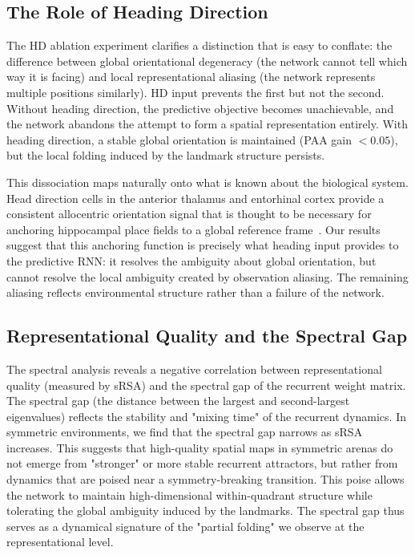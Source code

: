 \documentclass[11pt, a4paper]{article}
\begin{document}
\subsection{The Role of Heading Direction}

The HD ablation experiment clarifies a distinction that is easy to
conflate: the difference between global orientational degeneracy (the
network cannot tell which way it is facing) and local representational
aliasing (the network represents multiple positions similarly). HD input
prevents the first but not the second. Without heading direction, the
predictive objective becomes unachievable, and the network abandons the
attempt to form a spatial representation entirely. With heading direction,
a stable global orientation is maintained (PAA gain $< 0.05$), but the
local folding induced by the landmark structure persists.

This dissociation maps naturally onto what is known about the biological
system. Head direction cells in the anterior thalamus and entorhinal cortex
provide a consistent allocentric orientation signal that is thought to be
necessary for anchoring hippocampal place fields to a global reference
frame~\citep{lever2002}. Our results suggest that this anchoring function
is precisely what heading input provides to the predictive RNN: it resolves
the ambiguity about global orientation, but cannot resolve the local
ambiguity created by observation aliasing. The remaining
aliasing reflects environmental structure rather than a failure of the
network.

\subsection{Representational Quality and the Spectral Gap}

The spectral analysis reveals a negative correlation between representational quality (measured by sRSA) and the spectral gap of the recurrent weight matrix. The spectral gap (the distance between the largest and second-largest eigenvalues) reflects the stability and "mixing time" of the recurrent dynamics. In symmetric environments, we find that the spectral gap narrows as sRSA increases. This suggests that high-quality spatial maps in symmetric arenas do not emerge from "stronger" or more stable recurrent attractors, but rather from dynamics that are poised near a symmetry-breaking transition. This poise allows the network to maintain high-dimensional within-quadrant structure while tolerating the global ambiguity induced by the landmarks. The spectral gap thus serves as a dynamical signature of the "partial folding" we observe at the representational level.
\end{document}

